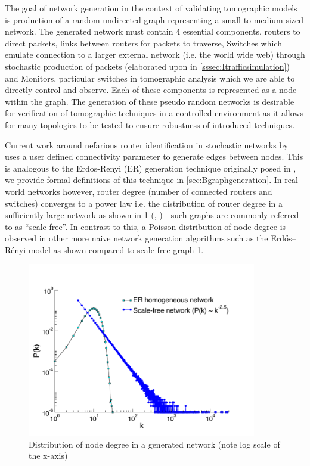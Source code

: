 The goal of network generation in the context of validating tomographic models is production of a random undirected graph representing a small to medium sized network. The generated network must contain 4 essential components, routers to direct packets, links between routers for packets to traverse, Switches which emulate connection to a larger external network (i.e. the world wide web) through stochastic production of packets (elaborated upon in \cref{sssec:Itrafficsimulation}) and Monitors, particular switches in tomographic analysis which we are able to directly control and observe. Each of these components is represented as a node within the graph. The generation of these pseudo random networks is desirable for verification of tomographic techniques in a controlled environment as it allows for many topologies to be tested to ensure robustness of introduced techniques.\par
Current work around nefarious router identification in stochastic networks by \cite{barnes_stochastic_2020} uses a user defined connectivity parameter to generate edges between nodes. This is analogous to the Erdos-Renyi (ER) generation technique originally posed in \cite{erdos_random_1959}, we provide formal definitions of this technique in \cref{sec:Bgraphgeneration}. In real world networks however, router degree (number of connected routers and switches) converges to a power law i.e. the distribution of router degree in a sufficiently large network as shown in \ref{fig:nddist} (\cite{chen_origin_2002}, \cite{zhao_measurement_2020}) - such graphs are commonly referred to as “scale-free”. In contrast to this, a Poisson distribution of node degree is observed in other more naive network generation algorithms such as the Erdős–Rényi model as shown compared to scale free graph \ref{fig:nddist}.
\begin{figure}[ht]
    \centering
    \includegraphics[width=10cm]{figs/intro/nodedegree-dist.png}
    \caption[Distribution of node degree in a generated network]{Distribution of node degree in a generated network (note log scale of the x-axis) \cite{baronchelli_networks_2013}}
    \label{fig:nddist}
\end{figure}
